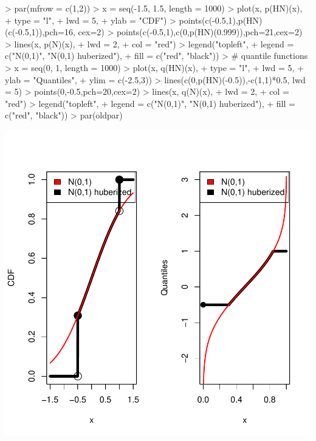 \documentclass[11pt]{article}
\begin{document}
\begin{Schunk}
\begin{Sinput}
> par(mfrow = c(1,2))
> x = seq(-1.5, 1.5, length = 1000)
> plot(x, p(HN)(x),
+      type = "l",
+      lwd = 5,
+      ylab = "CDF")
> points(c(-0.5,1),p(HN)(c(-0.5,1)),pch=16, cex=2)
> points(c(-0.5,1),c(0,p(HN)(0.999)),pch=21,cex=2)
> lines(x, p(N)(x),
+       lwd = 2,
+       col = "red")
> legend("topleft",
+        legend = c("N(0,1)", "N(0,1) huberized"),
+        fill = c("red", "black"))
> # quantile functions
> x = seq(0, 1, length = 1000)
> plot(x, q(HN)(x),
+      type = "l",
+      lwd = 5,
+      ylab = "Quantiles",
+      ylim = c(-2.5,3))
> lines(c(0,p(HN)(-0.5)),-c(1,1)*0.5, lwd = 5)
> points(0,-0.5,pch=20,cex=2)
> lines(x, q(N)(x),
+       lwd = 2,
+       col = "red")
> legend("topleft",
+        legend = c("N(0,1)", "N(0,1) huberized"),
+        fill = c("red", "black"))
> par(oldpar)
\end{Sinput}
\end{Schunk}
\includegraphics{distr-huberize}
\end{document}
